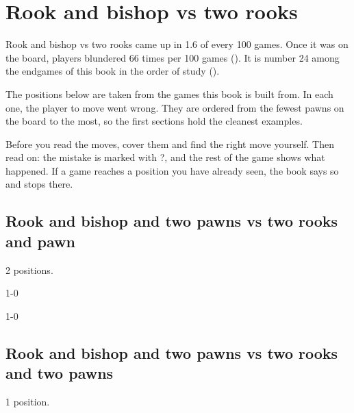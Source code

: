 \chapter{Rook and bishop vs two rooks}\label{ch:rook-and-bishop-vs-two-rooks}
Rook and bishop vs two rooks came up in 1.6 of every 100 games. Once it was on the board, players blundered 66 times per 100 games (). It is number 24 among the endgames of this book in the order of study ().

The positions below are taken from the games this book is built from. In each one, the player to move went wrong. They are ordered from the fewest pawns on the board to the most, so the first sections hold the cleanest examples.

Before you read the moves, cover them and find the right move yourself. Then read on: the mistake is marked with ?, and the rest of the game shows what happened. If a game reaches a position you have already seen, the book says so and stops there.


\section{Rook and bishop and two pawns vs two rooks and pawn}
2 positions.


1-0\par
{}

1-0\par
\section{Rook and bishop and two pawns vs two rooks and two pawns}
1 position.


